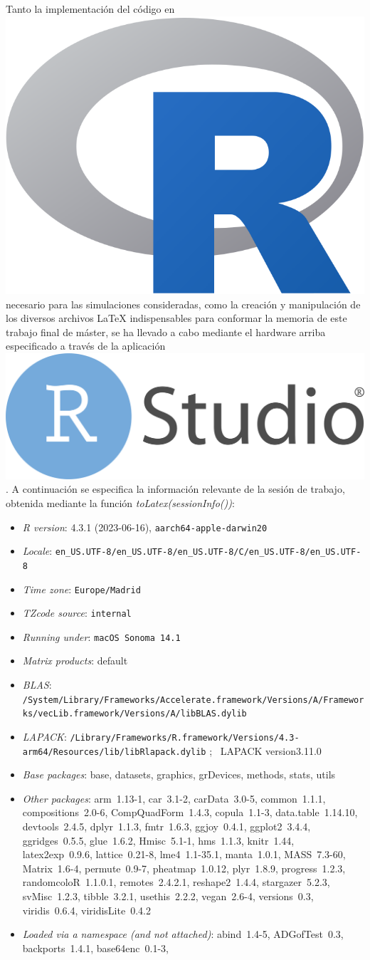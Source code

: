 \documentclass[IB,BIB]{TFUOC}%
\newcommand{\Rlogo}{\protect\includegraphics[height=2.5ex,keepaspectratio]{Rlogo.png}}
\newcommand{\RStudiologo}{\protect\includegraphics[height=2.5ex,keepaspectratio]{RStudiologo.png}}
\begin{document}
Tanto la implementación del código en \hspace{-.2em}\Rlogo\hspace{+.1em} necesario para las simulaciones consideradas, como la creación y manipulación de los diversos archivos \LaTeX\hspace{+.1em} indispensables para conformar la memoria de este trabajo final de máster, se ha llevado a cabo mediante el hardware arriba especificado a través de la aplicación \RStudiologo. A continuación se especifica la información relevante de la sesión de trabajo, obtenida mediante la función \textit{toLatex(sessionInfo())}:

\begin{itemize}\raggedright
  \small
  \item \textit{R version}: 4.3.1 (2023-06-16), \verb|aarch64-apple-darwin20|
  \item \textit{Locale}: \verb|en_US.UTF-8/en_US.UTF-8/en_US.UTF-8/C/en_US.UTF-8/en_US.UTF-8|
  \item \textit{Time zone}: \verb|Europe/Madrid|
  \item \textit{TZcode source}: \verb|internal|
  \item \textit{Running under}: \verb|macOS Sonoma 14.1|
  \item \textit{Matrix products}: default
  \item \textit{BLAS}: \tiny \verb|/System/Library/Frameworks/Accelerate.framework/Versions/A/Frameworks/vecLib.framework/Versions/A/libBLAS.dylib|
  \small
  \item \textit{LAPACK}: \tiny \verb|/Library/Frameworks/R.framework/Versions/4.3-arm64/Resources/lib/libRlapack.dylib|
; \quad\ LAPACK version3.11.0
  \small
  \item \textit{Base packages}: base, datasets, graphics, grDevices, methods, stats, utils
  \item \textit{Other packages}: \tiny arm~1.13-1, car~3.1-2, carData~3.0-5, common~1.1.1, compositions~2.0-6, CompQuadForm~1.4.3,
    copula~1.1-3, data.table~1.14.10, devtools~2.4.5, dplyr~1.1.3, fmtr~1.6.3, ggjoy~0.4.1, ggplot2~3.4.4, ggridges~0.5.5,
    glue~1.6.2, Hmisc~5.1-1, hms~1.1.3, knitr~1.44, latex2exp~0.9.6, lattice~0.21-8, lme4~1.1-35.1, manta~1.0.1, MASS~7.3-60,
    Matrix~1.6-4, permute~0.9-7, pheatmap~1.0.12, plyr~1.8.9, progress~1.2.3, randomcoloR~1.1.0.1, remotes~2.4.2.1,
    reshape2~1.4.4, stargazer~5.2.3, svMisc~1.2.3, tibble~3.2.1, usethis~2.2.2, vegan~2.6-4, versions~0.3, viridis~0.6.4,
    viridisLite~0.4.2
  \small
  \item \textit{Loaded via a namespace (and not attached)}: \tiny abind~1.4-5, ADGofTest~0.3, backports~1.4.1, base64enc~0.1-3,

\end{itemize}
\end{document}
